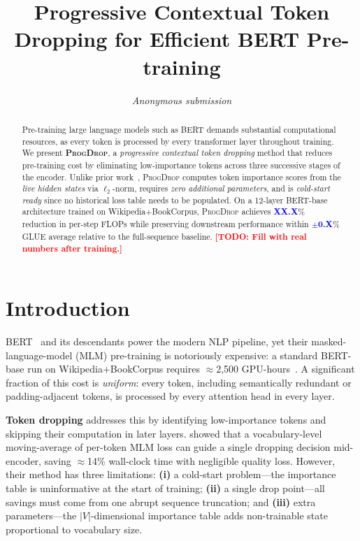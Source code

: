 \documentclass[11pt]{article}
\title{Progressive Contextual Token Dropping for Efficient BERT Pre-training}
\author{
  \textit{Anonymous submission}
}
\newcommand{\model}{\textsc{ProgDrop}}          %
\newcommand{\TODO}[1]{\textcolor{red}{\textbf{[TODO: #1]}}}
\newcommand{\RESULT}[1]{\textcolor{blue}{\textbf{#1}}}  %
\begin{document}
\maketitle

\begin{abstract}
Pre-training large language models such as BERT demands substantial
computational resources, as every token is processed by every transformer
layer throughout training.
We present \textbf{\model{}}, a \emph{progressive contextual token dropping}
method that reduces pre-training cost by eliminating low-importance tokens
across three successive stages of the encoder.
Unlike prior work~\citep{hou2022tokendrop}, \model{} computes token importance
scores from the \emph{live hidden states} via $\ell_2$-norm,
requires \emph{zero additional parameters}, and is \emph{cold-start ready}
since no historical loss table needs to be populated.
On a 12-layer BERT-base architecture trained on Wikipedia+BookCorpus,
\model{} achieves \RESULT{XX.X}\% reduction in per-step FLOPs
while preserving downstream performance within \RESULT{$\pm$0.X}\% GLUE average
relative to the full-sequence baseline.
\TODO{Fill with real numbers after training.}
\end{abstract}

\section{Introduction}
\label{sec:intro}

BERT~\citep{devlin2019bert} and its descendants power the modern NLP pipeline,
yet their masked-language-model (MLM) pre-training is notoriously expensive:
a standard BERT-base run on Wikipedia+BookCorpus requires $\approx$2,500
GPU-hours~\citep{liu2019roberta}.
A significant fraction of this cost is \emph{uniform}: every token, including
semantically redundant or padding-adjacent tokens, is processed by every
attention head in every layer.

\textbf{Token dropping} addresses this by identifying low-importance tokens
and skipping their computation in later layers.
\citet{hou2022tokendrop} showed that a vocabulary-level moving-average of
per-token MLM loss can guide a single dropping decision mid-encoder, saving
$\approx$14\% wall-clock time with negligible quality loss.
However, their method has three limitations:
\textbf{(i)} a cold-start problem—the importance table is uninformative at the
start of training;
\textbf{(ii)} a single drop point—all savings must come from one abrupt
sequence truncation; and
\textbf{(iii)} extra parameters—the $|V|$-dimensional importance table adds
non-trainable state proportional to vocabulary size.
\end{document}
